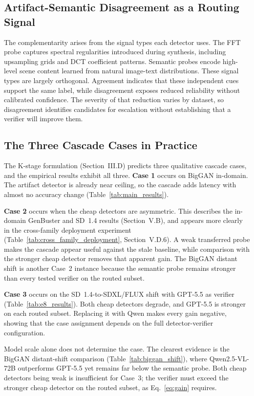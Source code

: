 \documentclass{ieeeaccess}
\begin{document}
\subsection{Artifact-Semantic Disagreement as a Routing Signal}

The complementarity arises from the signal types each detector uses. The FFT probe
captures spectral regularities introduced during synthesis, including upsampling grids
and DCT coefficient patterns. Semantic probes encode high-level scene content learned
from natural image-text distributions. These signal types are largely orthogonal.
Agreement indicates that these independent cues support the same label, while
disagreement exposes reduced reliability without calibrated confidence. The severity of
that reduction varies by dataset, so disagreement identifies candidates for escalation
without establishing that a verifier will improve them.

\subsection{The Three Cascade Cases in Practice}
\label{sec:three_cases}

The K-stage formulation (Section~III.D) predicts three qualitative cascade cases, and
the empirical results exhibit all three. \textbf{Case 1} occurs on BigGAN in-domain.
The artifact detector is already near ceiling, so the cascade adds latency with almost
no accuracy change (Table~\ref{tab:main_results}).

\textbf{Case 2} occurs when the cheap detectors are asymmetric. This describes the
in-domain GenBuster and SD~1.4 results (Section~V.B), and appears more clearly in the
cross-family deployment experiment (Table~\ref{tab:cross_family_deployment},
Section~V.D.6). A weak transferred probe makes the cascade appear useful against the
stale baseline, while comparison with the stronger cheap detector removes that apparent
gain. The BigGAN distant shift is another Case~2 instance because the semantic probe
remains stronger than every tested verifier on the routed subset.

\textbf{Case 3} occurs on the SD~1.4-to-SDXL/FLUX shift with GPT-5.5 as verifier
(Table~\ref{tab:e8_results}). Both cheap detectors degrade, and GPT-5.5 is stronger on
each routed subset. Replacing it with Qwen makes every gain negative, showing that the
case assignment depends on the full detector-verifier configuration.

Model scale alone does not determine the case. The clearest evidence is the
BigGAN distant-shift comparison (Table~\ref{tab:biggan_shift}), where Qwen2.5-VL-72B
outperforms GPT-5.5 yet remains far below the semantic probe. Both cheap detectors being
weak is insufficient for Case~3; the verifier must exceed the stronger cheap detector on
the routed subset, as Eq.~\eqref{eq:gain} requires.
\end{document}

